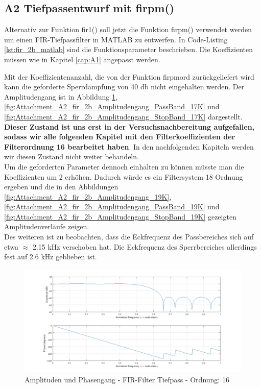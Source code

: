 \newpage
\subsection{A2 Tiefpassentwurf mit firpm()}


\noindent Alternativ zur Funktion fir1() soll jetzt die Funktion firpm() verwendet werden um einen FIR-Tiefpassfilter in MATLAB zu entwerfen. In Code-Listing \ref{lst:fir_2b_matlab} sind die Funktionsparameter beschrieben. Die Koeffizienten müssen wie in Kapitel \ref{cap:A1} angepasst werden.





\noindent Mit der Koeffizientenanzahl, die von der Funktion firpmord zurückgeliefert wird kann die geforderte Sperrdämpfung von 40 db nicht eingehalten werden. Der Amplitudengang ist in Abbildung \ref{fig:Attachment_A2_fir_2b_Amplitudengang_17K}, \ref{fig:Attachment_A2_fir_2b_Amplitudengang_PassBand_17K} und \ref{fig:Attachment_A2_fir_2b_Amplitudengang_StopBand_17K} dargestellt. \textbf{Dieser Zustand ist uns erst in der Versuchsnachbereitung aufgefallen, sodass wir alle folgenden Kapitel mit den Filterkoeffizienten der Filterordnung 16 bearbeitet haben}. In den nachfolgenden Kapiteln werden wir diesen Zustand nicht weiter behandeln.\\
Um die geforderten Parameter dennoch einhalten zu können müsste man die Koeffizienten um 2 erhöhen. Dadurch würde es ein Filtersystem 18 Ordnung ergeben und die in den Abbildungen \ref{fig:Attachment_A2_fir_2b_Amplitudengang_19K}, \ref{fig:Attachment_A2_fir_2b_Amplitudengang_PassBand_19K} und \ref{fig:Attachment_A2_fir_2b_Amplitudengang_StopBand_19K} gezeigten Amplitudenverläufe zeigen.\\
Des weiteren ist zu beobachten, dass die Eckfrequenz des Passbereiches sich auf etwa $\approx$ 2.15 kHz verschoben hat. Die Eckfrequenz des Sperrbereiches allerdings fest auf 2.6 kHz geblieben ist.

\begin{figure}[H]
\centering
\includegraphics[width=1.0\linewidth]{./Bilder/Attachment_A2_fir_2b_Amplitudengang_17K}
\caption{Amplituden und Phasengang - FIR-Filter Tiefpass - Ordnung: 16}
\label{fig:Attachment_A2_fir_2b_Amplitudengang_17K}
\end{figure}


